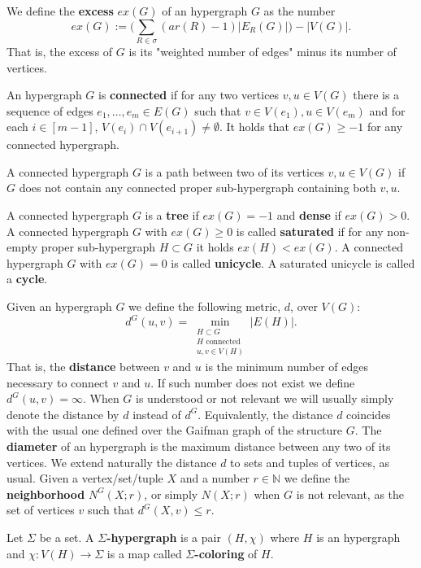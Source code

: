 \documentclass[12pt,notitlepage,a4paper]{article}
\theoremstyle{definition}
\newcommand{\N}{\mathbb{N}}
\begin{document}
We define the \textbf{excess} $ex(G)$ of an hypergraph $G$ as the number
\[
ex(G):= \big(\sum_{R\in \sigma} (ar(R)-1)|E_R(G)|\big) - |V(G)|.  
\] 
That is, the excess of $G$ is its "weighted number of edges"
minus its number of vertices. \par
An hypergraph $G$ is \textbf{connected} if for any two vertices $v,u\in V(G)$
there is a sequence of edges $e_1,\dots, e_m\in E(G)$ such that
$v\in V(e_1), u\in V(e_m)$ and for each $i\in [m-1]$, 
$V(e_i)\cap V(e_{i+1})\neq \emptyset$. It holds that
$ex(G)\geq -1$ for any connected hypergraph.
\par
A connected hypergraph $G$ is a path between two of its 
vertices $v,u\in V(G)$ if $G$ 
does not contain any connected proper sub-hypergraph containing both $v,u$.
\par
A connected hypergraph $G$ is a \textbf{tree} if $ex(G)=-1$ and \textbf{dense} if $ex(G)>0$.
A connected hypergraph $G$ with $ex(G)\geq 0$ is called \textbf{saturated} 
if for any non-empty proper sub-hypergraph
$H\subset G$ it holds $ex(H)<ex(G)$. 
A connected hypergraph $G$ with $ex(G)=0$ is called \textbf{unicycle}. 
A saturated unicycle is called a \textbf{cycle}. \par
Given an hypergraph $G$ we define the following metric, $d$, over $V(G)$:
\[ d^G(u,v)= \min_{\substack{H \subset G\\ 
		H \text{ connected }\\
		u,v\in V(H)}} |E(H)| .\]
That is, the \textbf{distance} between $v$ and $u$ is the minimum number of
edges necessary to connect $v$ and $u$. 
If such number does not exist we define $d^G(u,v)=\infty$. 
When $G$ 
is understood or not relevant we will usually simply denote the 
distance by $d$ instead of $d^G$. Equivalently, the distance $d$
coincides with the usual one defined over the Gaifman graph of the structure 
$G$. The \textbf{diameter} of an hypergraph is the maximum distance between any 
two of its vertices. 
We extend naturally the distance $d$ to sets and tuples of
vertices, as usual. Given a vertex/set/tuple $X$ and a number
$r\in \N$ we define the \textbf{neighborhood}
$N^G(X;r)$, or simply $N(X;r)$ when $G$ is not relevant,
as the set of vertices $v$ such that $d^G(X,v)\leq r$.
\par

Let $\Sigma$ be a set. A \textbf{$\Sigma$-hypergraph}
is a pair $(H, \chi)$ where $H$ is an hypergraph
and $\chi: V(H)\rightarrow \Sigma$ is a map 
called \textbf{$\Sigma$-coloring} of $H$. \par
\end{document}
